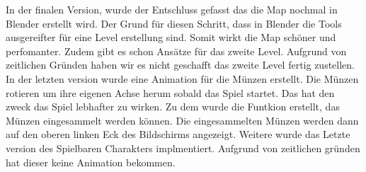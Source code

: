 In der finalen Version, wurde der Entschluss gefasst das die Map nochmal in Blender erstellt wird. Der Grund für diesen Schritt, dass in Blender die Tools ausgereifter für eine Level erstellung sind. Somit wirkt die Map schöner und perfomanter. Zudem gibt es schon Ansätze für das zweite Level. Aufgrund von zeitlichen Gründen haben wir es nicht geschafft das zweite Level fertig zustellen. In der letzten version wurde eine Animation für die Münzen erstellt. Die Münzen rotieren um ihre eigenen Achse herum sobald das Spiel startet. Das hat den zweck das Spiel lebhafter zu wirken. Zu dem wurde die Funtkion erstellt, das Münzen eingesammelt werden können. Die eingesammelten Münzen werden dann auf den oberen linken Eck des Bildschirms angezeigt. Weitere wurde das Letzte version des Spielbaren Charakters implmentiert. Aufgrund von zeitlichen gründen hat dieser keine Animation bekommen.  


\pagebreak

